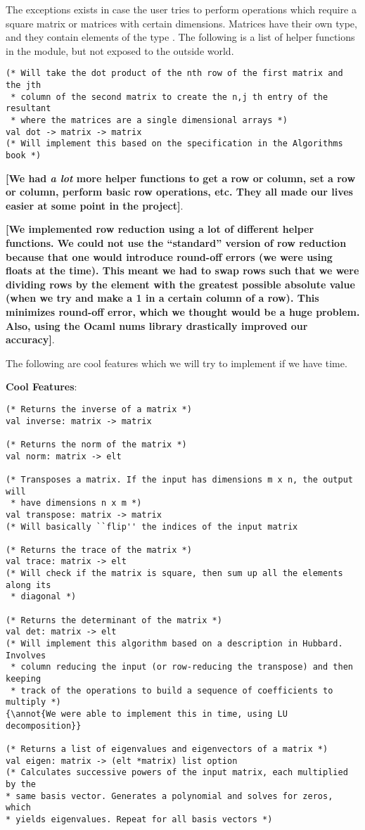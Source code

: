 \documentclass[letterpaper,11pt]{article}
\newcommand{\annot}[1]{\textbf{\color{BrickRed} [#1]}}
\begin{document}
The exceptions exists in case the user tries to perform operations which require
a square matrix or matrices with certain dimensions. Matrices have their own
type, and they contain elements of the type \verb@elt@. The following is a list
of helper functions in the module, but not exposed to the outside world.

\begin{verbatim}
(* Will take the dot product of the nth row of the first matrix and the jth
 * column of the second matrix to create the n,j th entry of the resultant 
 * where the matrices are a single dimensional arrays *)
val dot -> matrix -> matrix
(* Will implement this based on the specification in the Algorithms book *)
\end{verbatim}

{\annot{We had \emph{a lot} more helper functions to get a row or column, set a
row or column, perform basic row operations, etc. They all made our lives easier
at some point in the project}}.

{\annot{We implemented row reduction using a lot of different helper functions.
We could not use the ``standard'' version of row reduction because that one
would introduce round-off errors (we were using floats at the time). This meant
we had to swap rows such that we were dividing rows by the element with the
greatest possible absolute value (when we try and make a 1 in a certain column
of a row). This minimizes round-off error, which we thought would be a huge
problem. Also, using the Ocaml nums library drastically improved our accuracy}}.

The following are cool features which we will try to implement if we have time. 

\textbf{Cool Features}:

\begin{verbatim}
(* Returns the inverse of a matrix *)
val inverse: matrix -> matrix

(* Returns the norm of the matrix *)
val norm: matrix -> elt

(* Transposes a matrix. If the input has dimensions m x n, the output will
 * have dimensions n x m *)
val transpose: matrix -> matrix
(* Will basically ``flip'' the indices of the input matrix

(* Returns the trace of the matrix *)
val trace: matrix -> elt
(* Will check if the matrix is square, then sum up all the elements along its
 * diagonal *)

(* Returns the determinant of the matrix *)
val det: matrix -> elt
(* Will implement this algorithm based on a description in Hubbard. Involves
 * column reducing the input (or row-reducing the transpose) and then keeping
 * track of the operations to build a sequence of coefficients to multiply *)
{\annot{We were able to implement this in time, using LU decomposition}}

(* Returns a list of eigenvalues and eigenvectors of a matrix *)
val eigen: matrix -> (elt *matrix) list option
(* Calculates successive powers of the input matrix, each multiplied by the
* same basis vector. Generates a polynomial and solves for zeros, which
* yields eigenvalues. Repeat for all basis vectors *) 
\end{verbatim}
\end{document}
